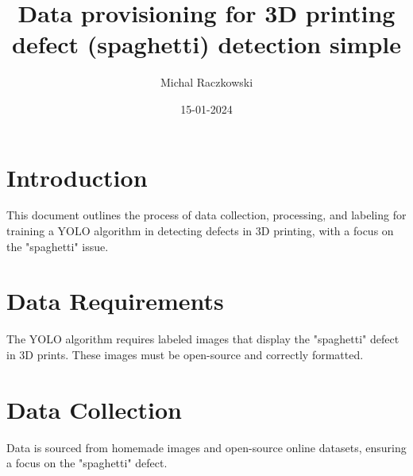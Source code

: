 \documentclass[12pt,a4paper]{article}
\title{\textbf{Data provisioning for 3D printing defect (spaghetti) detection simple}}
\author{Michal Raczkowski}
\date{15-01-2024}
\begin{document}
\maketitle
\thispagestyle{empty} %

\newpage
\tableofcontents
\newpage

\setcounter{page}{1} %

\section{Introduction}
This document outlines the process of data collection, processing, and labeling for training a YOLO algorithm in detecting defects in 3D printing, with a focus on the "spaghetti" issue.

\section{Data Requirements}
The YOLO algorithm requires labeled images that display the "spaghetti" defect in 3D prints. These images must be open-source and correctly formatted.

\section{Data Collection}
Data is sourced from homemade images and open-source online datasets, ensuring a focus on the "spaghetti" defect.
\end{document}
